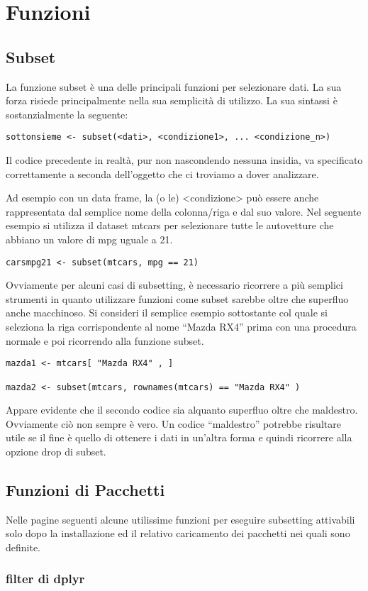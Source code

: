 \section{Funzioni}
\subsection{Subset}

La funzione subset è una delle principali funzioni per selezionare dati. La sua forza risiede principalmente nella sua semplicità di utilizzo.
La sua sintassi è sostanzialmente la seguente:

\begin{lstlisting}
sottonsieme <- subset(<dati>, <condizione1>, ... <condizione_n>)
\end{lstlisting}

Il codice precedente in realtà, pur non nascondendo nessuna insidia, va specificato correttamente a seconda dell’oggetto che ci troviamo a dover analizzare.

Ad esempio con un data frame, la (o le) <condizione> può essere anche rappresentata dal semplice nome della colonna/riga e dal suo valore. Nel seguente esempio si utilizza il dataset mtcars per selezionare tutte le autovetture che abbiano un valore di mpg uguale a 21.
\begin{lstlisting}
carsmpg21 <- subset(mtcars, mpg == 21)
\end{lstlisting}

Ovviamente per alcuni casi di subsetting, è necessario ricorrere a più semplici strumenti in quanto utilizzare funzioni come subset sarebbe oltre che superfluo anche macchinoso. Si consideri il semplice esempio sottostante col quale si seleziona la riga corrispondente al nome “Mazda RX4” prima con una procedura normale e poi ricorrendo alla funzione subset.
\begin{lstlisting}
mazda1 <- mtcars[ "Mazda RX4" , ]

mazda2 <- subset(mtcars, rownames(mtcars) == "Mazda RX4" )
\end{lstlisting}
Appare evidente che il secondo codice sia alquanto superfluo oltre che maldestro. Ovviamente ciò non sempre è vero. Un codice “maldestro” potrebbe risultare utile se il fine è quello di ottenere i dati in un’altra forma e quindi ricorrere alla opzione drop di subset.

\subsection{Funzioni di Pacchetti}
Nelle pagine seguenti alcune utilissime funzioni per eseguire subsetting attivabili solo dopo la installazione ed il relativo caricamento dei pacchetti nei quali sono definite.
\subsubsection{filter di dplyr}
